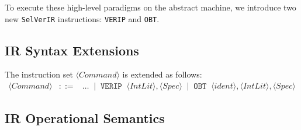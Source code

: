 \documentclass{article}
\begin{document}
To execute these high-level paradigms on the abstract machine, we introduce two new \texttt{SelVerIR} instructions: \texttt{VERIP} and \texttt{OBT}. 

\subsection{IR Syntax Extensions}
The instruction set $\langle \mathit{Command} \rangle$ is extended as follows:
\[
\begin{array}{rcl}
\langle \mathit{Command} \rangle
&::=& 
\dots
\;\mid\; \mathbf{\mathtt{VERIP} \;\; \langle \mathit{IntLit} \rangle\mathtt{,} \langle \mathit{Spec} \rangle}
\;\mid\; \mathbf{\mathtt{OBT} \;\; \langle \mathit{ident} \rangle\mathtt{,} \langle \mathit{IntLit} \rangle\mathtt{,} \langle \mathit{Spec} \rangle}
\end{array}
\]

\subsection{IR Operational Semantics}

\begin{table}[htb!]
\setlength{\tabcolsep}{0pt} 
\centering
\renewcommand{\arraystretch}{2.2} 
\large
{}
\caption{Operational semantics of SelVerIR LP instructions}
\label{tab:selverir-lp-sos}
\end{table}
\end{document}
